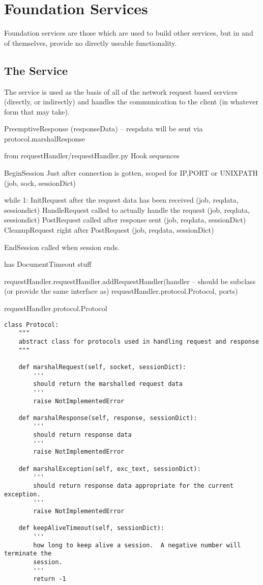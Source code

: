 \documentclass{manual}
\begin{document}
\section{Foundation Services}
Foundation services are those which are used to build other services,
but in and of themselves, provide no directly useable functionality.

\subsection{The  Service}
The  service is used as the basis of all of
the network request based services (directly, or indirectly) and
handles the communication to the client (in whatever form that may
take).

PreemptiveResponse (responseData) -- respdata will be sent via
protocol.marshalResponse

from requestHandler/requestHandler.py
Hook sequences

BeginSession  Just after connection is gotten, scoped for IP,PORT or UNIXPATH (job, sock, sessionDict)

while 1:
    InitRequest     after the request data has been received (job, reqdata, sessiondict)
    HandleRequest   called to actually handle the request (job, reqdata, sessiondict)
    PostRequest     called after response sent (job, reqdata, sessionDict)
    CleanupRequest  right after PostRequest (job, reqdata, sessionDict)

EndSession called when session ends.



has DocumentTimeout stuff

requestHandler.requestHandler.addRequestHandler(handler -- should be
    subclass (or provide the same interface as)
    requestHandler.protocol.Protocol, ports)


requestHandler.protocol.Protocol

\begin{verbatim}
class Protocol:
    """
    abstract class for protocols used in handling request and response
    """

    def marshalRequest(self, socket, sessionDict):
        '''
        should return the marshalled request data
        '''
        raise NotImplementedError

    def marshalResponse(self, response, sessionDict):
        '''
        should return response data
        '''
        raise NotImplementedError

    def marshalException(self, exc_text, sessionDict):
        '''
        should return response data appropriate for the current exception.
        '''
        raise NotImplementedError

    def keepAliveTimeout(self, sessionDict):
        '''
        how long to keep alive a session.  A negative number will terminate the
        session.
        '''
        return -1
\end{verbatim}
\end{document}
